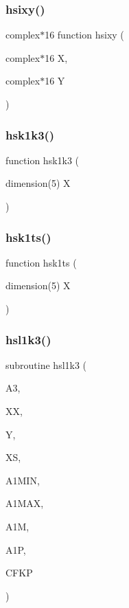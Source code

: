 \subsubsection{\texorpdfstring{hsixy()}{hsixy()}}
{\footnotesize\ttfamily complex$\ast$16 function hsixy (\begin{DoxyParamCaption}\item[{complex$\ast$16}]{X,  }\item[{complex$\ast$16}]{Y }\end{DoxyParamCaption})}

\mbox{\label{djangoh__h_8f_a53c5a7b73ac0147b97ff74b75f5ae5bb}} 
\subsubsection{\texorpdfstring{hsk1k3()}{hsk1k3()}}
{\footnotesize\ttfamily function hsk1k3 (\begin{DoxyParamCaption}\item[{dimension(5)}]{X }\end{DoxyParamCaption})}

\mbox{\label{djangoh__h_8f_a692a9648fb9a7a3fb31ce19d43f93320}} 
\subsubsection{\texorpdfstring{hsk1ts()}{hsk1ts()}}
{\footnotesize\ttfamily function hsk1ts (\begin{DoxyParamCaption}\item[{dimension(5)}]{X }\end{DoxyParamCaption})}

\mbox{\label{djangoh__h_8f_a3a4516117594d1ccca1c03af99d73875}} 
\subsubsection{\texorpdfstring{hsl1k3()}{hsl1k3()}}
{\footnotesize\ttfamily subroutine hsl1k3 (\begin{DoxyParamCaption}\item[{}]{A3,  }\item[{}]{XX,  }\item[{}]{Y,  }\item[{}]{XS,  }\item[{}]{A1\+M\+IN,  }\item[{}]{A1\+M\+AX,  }\item[{}]{A1M,  }\item[{}]{A1P,  }\item[{}]{C\+F\+KP }\end{DoxyParamCaption})}



